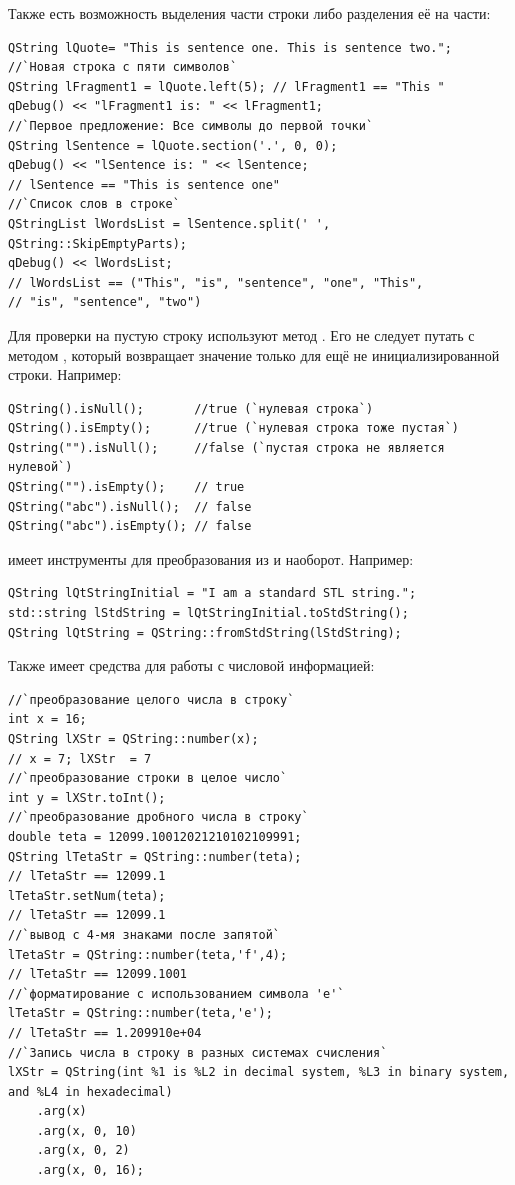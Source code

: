 Также есть возможность выделения части строки либо разделения её на части:
\begin{lstlisting}
QString lQuote= "This is sentence one. This is sentence two.";
//`Новая строка с пяти символов`
QString lFragment1 = lQuote.left(5); // lFragment1 == "This "
qDebug() << "lFragment1 is: " << lFragment1;
//`Первое предложение: Все символы до первой точки`
QString lSentence = lQuote.section('.', 0, 0);
qDebug() << "lSentence is: " << lSentence;
// lSentence == "This is sentence one"
//`Cписок слов в строке`
QStringList lWordsList = lSentence.split(' ', QString::SkipEmptyParts);
qDebug() << lWordsList;
// lWordsList == ("This", "is", "sentence", "one", "This",
// "is", "sentence", "two")
\end{lstlisting}

Для проверки на пустую строку используют метод . Его не следует путать с
методом , который возвращает значение  только для ещё не
инициализированной строки. Например:
\begin{lstlisting}
QString().isNull();       //true (`нулевая строка`)
QString().isEmpty();      //true (`нулевая строка тоже пустая`)
Qstring("").isNull();     //false (`пустая строка не является нулевой`)
QString("").isEmpty();    // true
QString("abc").isNull();  // false
QString("abc").isEmpty(); // false
\end{lstlisting}

 имеет инструменты для преобразования из  и наоборот.
Например:
\begin{lstlisting}
QString lQtStringInitial = "I am a standard STL string.";
std::string lStdString = lQtStringInitial.toStdString();
QString lQtString = QString::fromStdString(lStdString);
\end{lstlisting}

Также  имеет  средства для работы с числовой информацией:
\begin{lstlisting}
//`преобразование целого числа в строку`
int x = 16;
QString lXStr = QString::number(x);
// x = 7; lXStr  = 7
//`преобразование строки в целое число`
int y = lXStr.toInt();
//`преобразование дробного числа в строку`
double teta = 12099.10012021210102109991;
QString lTetaStr = QString::number(teta);
// lTetaStr == 12099.1
lTetaStr.setNum(teta);
// lTetaStr == 12099.1
//`вывод с 4-мя знаками после запятой`
lTetaStr = QString::number(teta,'f',4);
// lTetaStr == 12099.1001
//`форматирование с использованием символа 'e'`
lTetaStr = QString::number(teta,'e');
// lTetaStr == 1.209910e+04
//`Запись числа в строку в разных системах счисления`
lXStr = QString(int %1 is %L2 in decimal system, %L3 in binary system, and %L4 in hexadecimal)
    .arg(x)
    .arg(x, 0, 10)
    .arg(x, 0, 2)
    .arg(x, 0, 16);
\end{lstlisting}

